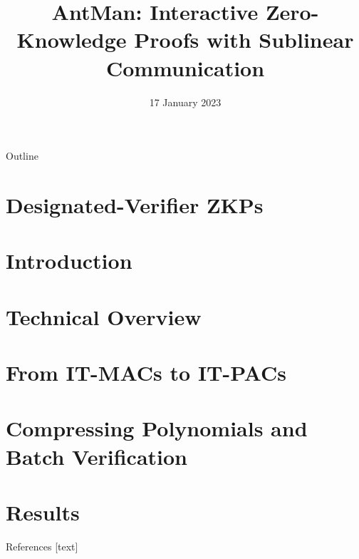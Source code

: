 \documentclass{beamer}
\title{AntMan: Interactive Zero-Knowledge Proofs with Sublinear Communication \cite{Weng0YX022}}
\date{17 January 2023}
\begin{document}
	\begin{frame}
		\titlepage
	\end{frame}
	
	\begin{frame}{Outline}
		\tableofcontents
	\end{frame}
	
	\section{Designated-Verifier ZKPs}
	
	
	\section{Introduction}
	
	
	\section{Technical Overview}
	
	
	\section{From IT-MACs to IT-PACs}
	
	
	\section{Compressing Polynomials and Batch Verification}
	
	
	\section{Results}
	
	
	\thankyouframe
	
	\begin{frame}[allowframebreaks]{References}
		
		
		
	\end{frame}
	
\end{document}
